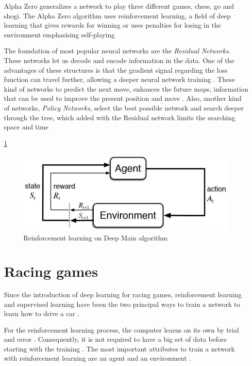 \documentclass[conference]{IEEEtran}
\begin{document}
Alpha Zero generalizes a network to play three different games, chess, go and shogi. The Alpha Zero algorithm uses reinforcement learning, a field of deep learning that gives rewards for winning or uses penalties for losing in the environment emphasising self-playing \cite{how}

The foundation of most popular neural networks are the \textit{Residual Networks}. These networks let us decode and encode information in the data. One of the advantages of these structures is that the gradient signal regarding the loss function can travel further, allowing a deeper neural network training \cite{how}. These kind of networks to predict the next move, enhances the future maps, information that can be used to improve the present position and move \cite{how}. Also, another kind of networks, \textit{Policy Networks}, select the best possible network and search deeper through the tree, which added with the Residual network limits the searching space and time \cite{how}





\ref{chess:reinforcement}

\begin{figure}[h]
\includegraphics[scale=0.52]{img/deepchess}
\caption{Reinforcement learning on Deep Main algorithm \cite{how}}
\label{chess:reinforcement}
\end{figure}





\section{Racing games}

Since the introduction of deep learning for racing games, reinforcement learning and supervised learning have been the two principal ways to train a network to learn how to drive a car \cite{racingpdf}.

For the reinforcement learning process, the computer learns on its own by trial and error \cite{racingpdf}. Consequently, it is not required to have a big set of data before starting with the training \cite{racingpdf}. The most important attributes to train a network with reinforcement learning are an agent and an environment \cite{racingpdf}.
\end{document}
